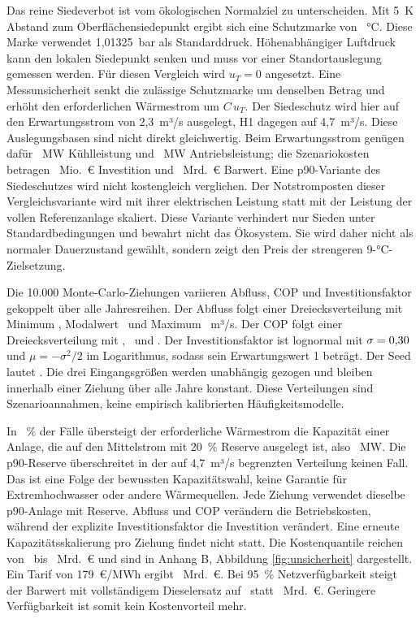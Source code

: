Das reine Siedeverbot ist vom ökologischen Normalziel zu unterscheiden. Mit 5~K Abstand zum Oberflächensiedepunkt ergibt sich eine Schutzmarke von \GuardTarget~°C. Diese Marke verwendet 1,01325~bar als Standarddruck. Höhenabhängiger Luftdruck kann den lokalen Siedepunkt senken und muss vor einer Standortauslegung gemessen werden. Für diesen Vergleich wird \(u_T=0\) angesetzt. Eine Messunsicherheit senkt die zulässige Schutzmarke um denselben Betrag und erhöht den erforderlichen Wärmestrom um \(C\,u_T\). Der Siedeschutz wird hier auf den Erwartungsstrom von 2,3~m³/s ausgelegt, H1 dagegen auf 4,7~m³/s. Diese Auslegungsbasen sind nicht direkt gleichwertig. Beim Erwartungsstrom genügen dafür \GuardCooling~MW Kühlleistung und \GuardElectric~MW Antriebsleistung; die Szenariokosten betragen \GuardCapex~Mio.~€ Investition und \GuardNpv~Mrd.~€ Barwert. Eine p90-Variante des Siedeschutzes wird nicht kostengleich verglichen. Der Notstromposten dieser Vergleichsvariante wird mit ihrer elektrischen Leistung statt mit der Leistung der vollen Referenzanlage skaliert. Diese Variante verhindert nur Sieden unter Standardbedingungen und bewahrt nicht das Ökosystem. Sie wird daher nicht als normaler Dauerzustand gewählt, sondern zeigt den Preis der strengeren 9-°C-Zielsetzung.

Die 10.000 Monte-Carlo-Ziehungen variieren Abfluss, COP und Investitionsfaktor gekoppelt über alle Jahresreihen. Der Abfluss folgt einer Dreiecksverteilung mit Minimum \McDischargeLow, Modalwert \McDischargeMode~und Maximum \McDischargeHigh~m³/s. Der COP folgt einer Dreiecksverteilung mit \McCopLow, \McCopMode~und \McCopHigh. Der Investitionsfaktor ist lognormal mit \(\sigma=0{,}30\) und \(\mu=-\sigma^2/2\) im Logarithmus, sodass sein Erwartungswert 1 beträgt. Der Seed lautet \McSeed. Die drei Eingangsgrößen werden unabhängig gezogen und bleiben innerhalb einer Ziehung über alle Jahre konstant. Diese Verteilungen sind Szenarioannahmen, keine empirisch kalibrierten Häufigkeitsmodelle.

In \MeanOverloadPercent~\% der Fälle übersteigt der erforderliche Wärmestrom die Kapazität einer Anlage, die auf den Mittelstrom mit 20~\% Reserve ausgelegt ist, also \MeanCapacity~MW. Die p90-Reserve überschreitet in der auf 4,7~m³/s begrenzten Verteilung keinen Fall. Das ist eine Folge der bewussten Kapazitätswahl, keine Garantie für Extremhochwasser oder andere Wärmequellen. Jede Ziehung verwendet dieselbe p90-Anlage mit Reserve. Abfluss und COP verändern die Betriebskosten, während der explizite Investitionsfaktor die Investition verändert. Eine erneute Kapazitätsskalierung pro Ziehung findet nicht statt. Die Kostenquantile reichen von \NpvSampleLow~bis \NpvSampleHigh~Mrd.~€ und sind in Anhang B, Abbildung \ref{fig:unsicherheit} dargestellt. Ein Tarif von 179~€/MWh ergibt \TariffHighNpv~Mrd.~€. Bei 95~\% Netzverfügbarkeit steigt der Barwert mit vollständigem Dieselersatz auf \AvailabilityLowNpv~statt \AvailabilityHighNpv~Mrd.~€. Geringere Verfügbarkeit ist somit kein Kostenvorteil mehr.


